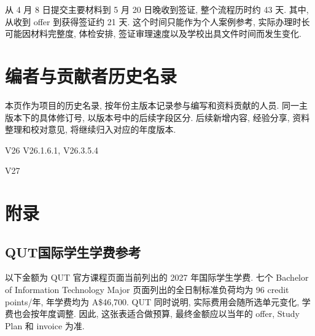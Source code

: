 \documentclass{jit-qut}
\newcommand{\guideversion}{V26.3.5.4}
\begin{document}
从 4 月 8 日提交主要材料到 5 月 20 日晚收到签证, 整个流程历时约 43 天. 其中, 从收到 offer 到获得签证约 21 天. 这个时间只能作为个人案例参考, 实际办理时长可能因材料完整度, 体检安排, 签证审理速度以及学校出具文件时间而发生变化.

\clearpage
\section*{编者与贡献者历史名录}

本页作为项目的历史名录, 按年份主版本记录参与编写和资料贡献的人员. 同一主版本下的具体修订号, 以版本号中的后续字段区分. 后续新增内容, 经验分享, 资料整理和校对意见, 将继续归入对应的年度版本.

\begingroup
\footnotesize
\qutversionroster
  {V26}
  {V26.1.6.1, \guideversion}
  {
   }
  {
   }

\qutversionroster
  {V27}
  {}
  {}
  {}
\endgroup

\clearpage
\appendix
\clearpage
\section{附录}
\subsection{QUT国际学生学费参考}\label{app:qut-fees}

以下金额为 QUT 官方课程页面当前列出的 2027 年国际学生学费. 七个 Bachelor of Information Technology Major 页面列出的全日制标准负荷均为 96 credit points/年, 年学费均为 A\$46,700. QUT 同时说明, 实际费用会随所选单元变化, 学费也会按年度调整. 因此, 这张表适合做预算, 最终金额应以当年的 offer, Study Plan 和 invoice 为准.
\end{document}
